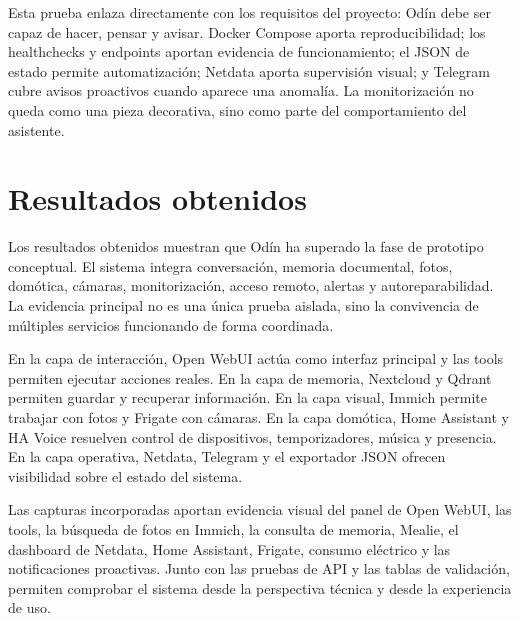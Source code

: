 Esta prueba enlaza directamente con los requisitos del proyecto: Odín debe ser capaz de hacer, pensar y avisar. Docker Compose aporta reproducibilidad; los healthchecks y endpoints aportan evidencia de funcionamiento; el JSON de estado permite automatización; Netdata aporta supervisión visual; y Telegram cubre avisos proactivos cuando aparece una anomalía. La monitorización no queda como una pieza decorativa, sino como parte del comportamiento del asistente.




\section{Resultados obtenidos}
Los resultados obtenidos muestran que Odín ha superado la fase de prototipo conceptual. El sistema integra conversación, memoria documental, fotos, domótica, cámaras, monitorización, acceso remoto, alertas y autoreparabilidad. La evidencia principal no es una única prueba aislada, sino la convivencia de múltiples servicios funcionando de forma coordinada.

En la capa de interacción, Open WebUI actúa como interfaz principal y las tools permiten ejecutar acciones reales. En la capa de memoria, Nextcloud y Qdrant permiten guardar y recuperar información. En la capa visual, Immich permite trabajar con fotos y Frigate con cámaras. En la capa domótica, Home Assistant y HA Voice resuelven control de dispositivos, temporizadores, música y presencia. En la capa operativa, Netdata, Telegram y el exportador JSON ofrecen visibilidad sobre el estado del sistema.

Las capturas incorporadas aportan evidencia visual del panel de Open WebUI, las tools, la búsqueda de fotos en Immich, la consulta de memoria, Mealie, el dashboard de Netdata, Home Assistant, Frigate, consumo eléctrico y las notificaciones proactivas. Junto con las pruebas de API y las tablas de validación, permiten comprobar el sistema desde la perspectiva técnica y desde la experiencia de uso.

